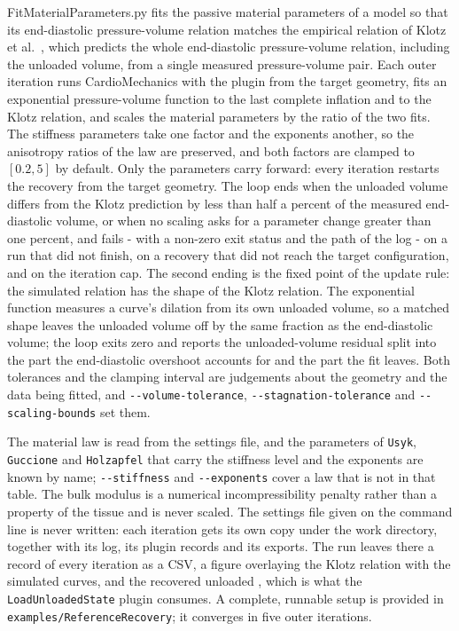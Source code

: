 FitMaterialParameters.py fits the passive material parameters of a model so that its end-diastolic pressure-volume relation matches the empirical relation of Klotz et al.~\cite{Klotz-2006}, which predicts the whole end-diastolic pressure-volume relation, including the unloaded volume, from a single measured pressure-volume pair.
Each outer iteration runs CardioMechanics with the  plugin from the target geometry, fits an exponential pressure-volume function to the last complete inflation and to the Klotz relation, and scales the material parameters by the ratio of the two fits.
The stiffness parameters take one factor and the exponents another, so the anisotropy ratios of the law are preserved, and both factors are clamped to $[0.2, 5]$ by default.
Only the parameters carry forward: every iteration restarts the recovery from the target geometry.
The loop ends when the unloaded volume differs from the Klotz prediction by less than half a percent of the measured end-diastolic volume, or when no scaling asks for a parameter change greater than one percent, and fails - with a non-zero exit status and the path of the log - on a run that did not finish, on a recovery that did not reach the target configuration, and on the iteration cap.
The second ending is the fixed point of the update rule: the simulated relation has the shape of the Klotz relation.
The exponential function measures a curve's dilation from its own unloaded volume, so a matched shape leaves the unloaded volume off by the same fraction as the end-diastolic volume; the loop exits zero and reports the unloaded-volume residual split into the part the end-diastolic overshoot accounts for and the part the fit leaves.
Both tolerances and the clamping interval are judgements about the geometry and the data being fitted, and \verb|--volume-tolerance|, \verb|--stagnation-tolerance| and \verb|--scaling-bounds| set them.

The material law is read from the settings file, and the parameters of \verb|Usyk|, \verb|Guccione| and \verb|Holzapfel| that carry the stiffness level and the exponents are known by name; \verb|--stiffness| and \verb|--exponents| cover a law that is not in that table.
The bulk modulus is a numerical incompressibility penalty rather than a property of the tissue and is never scaled.
The settings file given on the command line is never written: each iteration gets its own copy under the work directory, together with its log, its plugin records and its exports.
The run leaves there a record of every iteration as a CSV, a figure overlaying the Klotz relation with the simulated curves, and the recovered unloaded , which is what the \verb|LoadUnloadedState| plugin consumes.
A complete, runnable setup is provided in \verb|examples/ReferenceRecovery|; it converges in five outer iterations.

